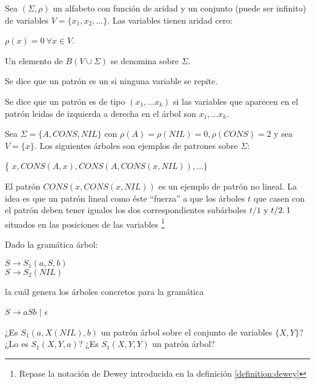 \begin{definition}
Sea $(\Sigma, \rho)$ un alfabeto con función de aridad
y un conjunto (puede ser infinito) 
de variables $V =\{ x_1, x_2, \ldots \}$. 
Las variables tienen
aridad cero: 

\begin{center}
$\rho(x) = 0\ \forall x \in V$. 
\end{center}

Un elemento de $B(V \cup \Sigma)$
se denomina  sobre $\Sigma$.
\end{definition}

\begin{definition}
Se dice que un
patrón es un  si ninguna variable se repite.
\end{definition}

\begin{definition}
Se dice que un patrón es de tipo $(x_1, \ldots x_k)$ si las variables
que aparecen en el patrón leidas de izquierda a derecha en el árbol
son $x_1, \ldots x_k$.
\end{definition}

\begin{example}
Sea $\Sigma = \{A, CONS, NIL \}$ con $\rho(A) = \rho(NIL) = 0, \rho(CONS) = 2$
y sea $V = \{ x \}$. Los siguientes árboles son ejemplos de 
patrones sobre $\Sigma$:

\begin{center}
\{ $x, CONS(A, x), CONS(A, CONS(x, NIL)), \ldots \}$
\end{center}

El patrón $CONS(x, CONS(x, NIL))$ es un ejemplo de patrón no lineal.
La idea es que un patrón lineal como éste ``fuerza'' a que los árboles $t$
que casen con el patrón deben tener iguales los dos correspondientes
subárboles $t/1$ y $t/2 \ldotp 1$ situados en las posiciones de las variables
\footnote{Repase la notación de Dewey introducida en 
la definición \ref{definition:dewey}}

\end{example}

\begin{exercise}
Dado la gramática árbol:

\begin{center}
$S \rightarrow S_1(a, S, b)$\\
$S \rightarrow S_2(NIL)$ 
\end{center}

\noindent la cuál genera los árboles concretos para la gramática

\begin{center}
$S \rightarrow aSb$  $|$ $\epsilon$
\end{center}

\noindent ¿Es $S_1(a, X(NIL), b)$ un patrón árbol sobre el conjunto de variables $\{X, Y\}$?
¿Lo es $S_1(X, Y, a)$? ¿Es $S_1(X, Y, Y)$ un patrón árbol?
\end{exercise}

